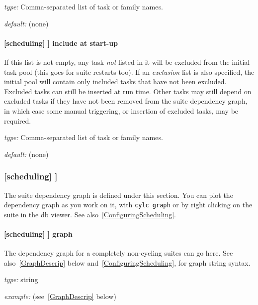 \begin{myitemize}
    \item {\em type:} Comma-separated list of task or family names.
    \item {\em default:} (none)
\end{myitemize}

\paragraph[include at start-up]{[scheduling] \textrightarrow [[special tasks]] \textrightarrow include at start-up}
\label{IASU}

If this list is not empty, any task {\em not} listed in it will be
excluded from the initial task pool (this goes for suite restarts too).
If an {\em exclusion} list is also specified, the initial pool will
contain only included tasks that have not been excluded. Excluded tasks
can still be inserted at run time. Other tasks may still depend on
excluded tasks if they have not been removed from the suite dependency
graph, in which case some manual triggering, or insertion of excluded
tasks, may be required.

\begin{myitemize}
    \item {\em type:} Comma-separated list of task or family names.
    \item {\em default:} (none)
\end{myitemize}

\subsubsection[{[[}dependencies{]]}]{[scheduling] \textrightarrow [[dependencies]]}

The suite dependency graph is defined under this section.  You can plot
the dependency graph as you work on it, with \lstinline=cylc graph= or
by right clicking on the suite in the db viewer.  See
also~\ref{ConfiguringScheduling}.

\paragraph[graph]{ [scheduling] \textrightarrow [[dependencies]] \textrightarrow graph }

The dependency graph for a completely non-cycling suites can go here.
See also~\ref{GraphDescrip} below and~\ref{ConfiguringScheduling}, for graph
string syntax.
\begin{myitemize}
    \item {\em type:} string
    \item {\em example:} (see~\ref{GraphDescrip} below)
\end{myitemize}

